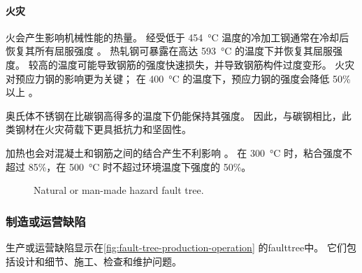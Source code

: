 \paragraph{火灾}
火会产生影响机械性能的热量。 经受低于 \qty{454}{\celsius} 温度的冷加工钢通常在冷却后恢复其所有屈服强度 \cite{suprenant1996e}。 热轧钢可暴露在高达 \qty{593}{\celsius} 的温度下并恢复其屈服强度。 较高的温度可能导致钢筋的强度快速损失，并导致钢筋构件过度变形。 火灾对预应力钢的影响更为关键； 在 \qty{400}{\celsius} 的温度下，预应力钢的强度会降低 50\% 以上 \cite{suprenant1996e}。

奥氏体不锈钢在比碳钢高得多的温度下仍能保持其强度。 因此，与碳钢相比，此类钢材在火灾荷载下更具抵抗力和坚固性\cite{markeset2006g}。

加热也会对混凝土和钢筋之间的结合产生不利影响 \cite{suprenant1996e}。 在 \qty{300}{\celsius} 时，粘合强度不超过 85\%，在 \qty{500}{\celsius} 时不超过环境温度下强度的 50\%。

\begin{figure}
  \caption{Natural or man-made hazard fault tree.}
  \label{fig:fault-tree-natural-manmade}
\end{figure}

\subsubsection{制造或运营缺陷}
生产或运营缺陷显示在\cref{fig:fault-tree-production-operation} 的\gls*{faulttree}中。 它们包括设计和细节、施工、检查和维护问题。

